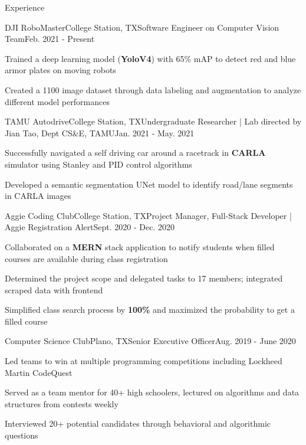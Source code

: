 \documentclass{resume} %
\begin{document}
\begin{rSection}{Experience}
\begin{rSubsection}{DJI RoboMaster}{College Station, TX}{Software Engineer on Computer Vision Team}{Feb. 2021 - Present}
    \item Trained a deep learning model (\textbf{YoloV4}) with 65\% mAP to detect red and blue armor plates on moving robots
    \item Created a 1100 image dataset through data labeling and augmentation to analyze different model performances %
\end{rSubsection}

\begin{rSubsection}{TAMU Autodrive}{College Station, TX}{Undergraduate Researcher | Lab directed by Jian Tao, Dept CS\&E, TAMU}{Jan. 2021 - May. 2021}
    \item Successfully navigated a self driving car around a racetrack in \textbf{CARLA} simulator using Stanley and PID control algorithms 
    \item Developed a semantic segmentation UNet model to identify road/lane segments in CARLA images
\end{rSubsection}

\begin{rSubsection}{Aggie Coding Club}{College Station, TX}{Project Manager, Full-Stack Developer | Aggie Registration Alert}{Sept. 2020 - Dec. 2020}
    \item Collaborated on a \textbf{MERN} stack application to notify students when filled courses are available during class registration
    \item Determined the project scope and delegated tasks to 17 members; integrated scraped data with frontend
    \item Simplified class search process by \textbf{100\%} and maximized the probability to get a filled course
\end{rSubsection}

\begin{rSubsection}{Computer Science Club}{Plano, TX}{Senior Executive Officer}{Aug. 2019 - June 2020}
    \item Led teams to win at multiple programming competitions including Lockheed Martin CodeQuest
    \item Served as a team mentor for 40+ high schoolers, lectured on algorithms and data structures from contests weekly
    \item Interviewed 20+ potential candidates through behavioral and algorithmic questions
\end{rSubsection}
\end{rSection}
\end{document}
